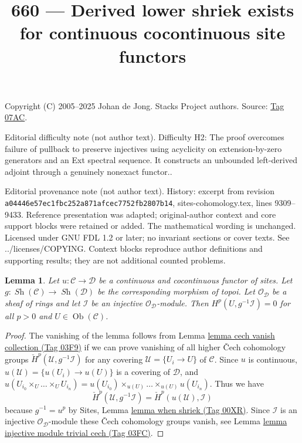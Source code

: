 \documentclass{amsart}
\theoremstyle{plain}
\newtheorem{lemma}[subsection]{Lemma}
\theoremstyle{definition}
\theoremstyle{remark}
\numberwithin{equation}{subsection}
\def\Ob{\mathop{\mathrm{Ob}}\nolimits}
\def\Sh{\mathop{\mathit{Sh}}\nolimits}
\begin{document}
\title[Stacks Project, Tag 07AC]{660 --- Derived lower shriek exists for continuous cocontinuous site functors}
\maketitle
\noindent Copyright (C) 2005--2025 Johan de Jong. Stacks Project authors. Source: \href{https://stacks.math.columbia.edu/tag/07AC}{Tag 07AC}.

\noindent Editorial difficulty note (not author text). Difficulty H2: The proof overcomes failure of pullback to preserve injectives using acyclicity on extension-by-zero generators and an Ext spectral sequence. It constructs an unbounded left-derived adjoint through a genuinely nonexact functor..

\noindent Editorial provenance note (not author text). History: excerpt from revision \texttt{a0444\allowbreak 6e57e\allowbreak c1fbc\allowbreak 252a8\allowbreak 71afc\allowbreak ec775\allowbreak 2fb28\allowbreak 07b14}, sites-cohomology.tex, lines 9309--9433. Reference presentation was adapted; original-author context and core support blocks were retained or added. The mathematical wording is unchanged. Licensed under GNU FDL 1.2 or later; no invariant sections or cover texts. See ../licenses/COPYING. Context blocks reproduce author definitions and supporting results; they are not additional counted problems.

\begin{lemma}
\label{lemma-pullback-injective-pre-limp}
Let $u : \mathcal{C} \to \mathcal{D}$ be a continuous and cocontinuous
functor of sites. Let $g : \Sh(\mathcal{C}) \to \Sh(\mathcal{D})$
be the corresponding morphism of topoi. Let $\mathcal{O}_\mathcal{D}$
be a sheaf of rings and let $\mathcal{I}$ be an injective
$\mathcal{O}_\mathcal{D}$-module. Then
$H^p(U, g^{-1}\mathcal{I}) = 0$ for all $p > 0$ and $U \in \Ob(\mathcal{C})$.
\end{lemma}

\begin{proof}
The vanishing of the lemma follows from
Lemma \href{https://stacks.math.columbia.edu/tag/03F9}{lemma cech vanish collection (Tag 03F9)}
if we can prove vanishing of all higher
{\v C}ech cohomology groups
$\check H^p(\mathcal{U}, g^{-1}\mathcal{I})$
for any covering $\mathcal{U} = \{U_i \to U\}$ of $\mathcal{C}$.
Since $u$ is continuous, $u(\mathcal{U}) = \{u(U_i) \to u(U)\}$
is a covering of $\mathcal{D}$, and
$u(U_{i_0} \times_U \ldots \times_U U_{i_n}) =
u(U_{i_0}) \times_{u(U)} \ldots \times_{u(U)} u(U_{i_n})$.
Thus we have
$$
\check H^p(\mathcal{U}, g^{-1}\mathcal{I}) =
\check H^p(u(\mathcal{U}), \mathcal{I})
$$
because $g^{-1} = u^p$ by Sites, Lemma \href{https://stacks.math.columbia.edu/tag/00XR}{lemma when shriek (Tag 00XR)}.
Since $\mathcal{I}$ is an injective
$\mathcal{O}_\mathcal{D}$-module these {\v C}ech cohomology groups vanish, see
Lemma \href{https://stacks.math.columbia.edu/tag/03FC}{lemma injective module trivial cech (Tag 03FC)}.
\end{proof}
\end{document}
